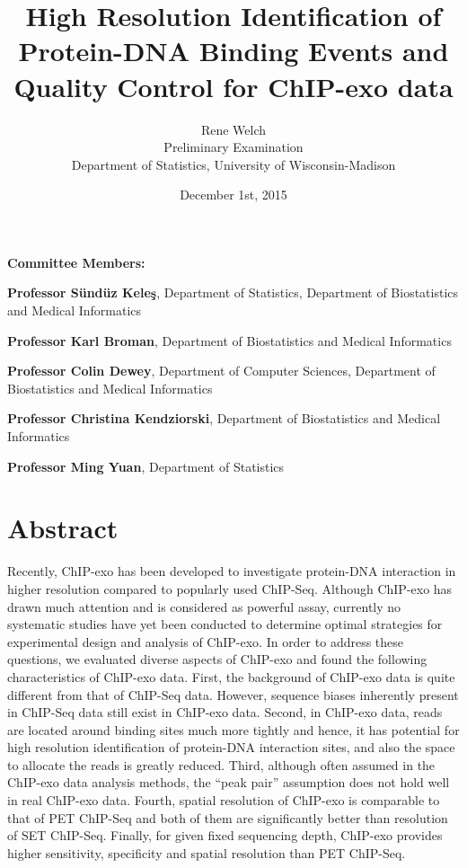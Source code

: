 \documentclass[11pt]{article}\usepackage[]{graphicx}\usepackage[]{color}
\title{High Resolution Identification of Protein-DNA Binding Events
  and Quality Control for ChIP-exo data\vspace*{\fill}}
\author{Rene Welch\\Preliminary Examination\\Department of Statistics,
  University of Wisconsin-Madison}
\date{December 1st, 2015}
\begin{document}
\newcommand{\sig}{\sigma^{70}}


\maketitle

\vspace*{\fill}

\textbf{Committee Members:}

\textbf{Professor S\"und\"uz Kele\c{s}}, Department of Statistics,
Department of Biostatistics and Medical Informatics

\textbf{Professor Karl Broman}, Department of Biostatistics and
Medical Informatics

\textbf{Professor Colin Dewey}, Department of Computer Sciences,
Department of Biostatistics and Medical Informatics

\textbf{Professor Christina Kendziorski}, Department of Biostatistics
and Medical Informatics

\textbf{Professor Ming Yuan}, Department of Statistics

\thispagestyle{empty}


\newpage

\tableofcontents

\newpage

\listoffigures

\newpage


\section*{Abstract}

    Recently, ChIP-exo has been developed to investigate protein-DNA
    interaction in higher resolution compared to popularly used
    ChIP-Seq. Although ChIP-exo has drawn much attention and is
    considered as powerful assay, currently no systematic studies
    have yet been conducted to determine optimal strategies for
    experimental design and analysis of ChIP-exo. In order to address
    these questions, we evaluated diverse aspects of ChIP-exo and
    found the following characteristics of ChIP-exo data. First, the
    background of ChIP-exo data is quite different from that of
    ChIP-Seq data. However, sequence biases inherently present in
    ChIP-Seq data still exist in ChIP-exo data. Second, in ChIP-exo
    data, reads are located around binding sites much more tightly and
    hence, it has potential for high resolution identification of
    protein-DNA interaction sites, and also the space to allocate the
    reads is greatly reduced. Third, although often assumed in the
    ChIP-exo data analysis methods, the ``peak pair'' assumption does
    not hold well in real ChIP-exo data. Fourth, spatial resolution of
    ChIP-exo is comparable to that of PET ChIP-Seq and both of them
    are significantly better than resolution of SET ChIP-Seq. Finally,
    for given fixed sequencing depth, ChIP-exo provides higher
    sensitivity, specificity and spatial resolution than PET
    ChIP-Seq.
\end{document}
